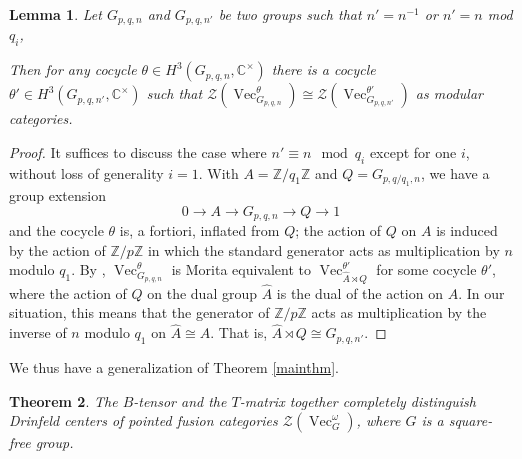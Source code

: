 \documentclass[11pt]{book}
\newtheorem{theorem}{Theorem}[section]
\newtheorem{Lem}[theorem]{Lemma}
\theoremstyle{Rem}
\theoremstyle{definition}
\numberwithin{equation}{section}
\newcommand\inv{^{-1}}
\newcommand\Vect{\operatorname{Vec}}
\newcommand\CC{\mathbb C}
\newcommand\ZZ{\mathbb Z}
\newcommand\CCu{\CC^\times}
\newcommand\CTR{\mathcal Z}
\newcommand\semdir{\rtimes}
\begin{document}
\begin{Lem}
Let $G_{p,q,n}$ and $G_{p,q,n'}$ be two groups such that $n'=n\inv$ or $n'=n$ mod $q_i$,

  Then for any cocycle $\theta\in H^3(G_{p,q,n},\CCu)$ there is a cocycle $\theta'\in H^3(G_{p,q,n'},\CCu)$ such that $\CTR(\Vect_{G_{p,q,n}}^\theta)\cong\CTR(\Vect_{G_{p,q,n'}}^{\theta'})$ as modular categories.
\end{Lem}
\begin{proof}
  It suffices to discuss the case where $n'\equiv n\mod q_i$ except for one $i$, without loss of generality $i=1$. With $A=\ZZ/q_1\ZZ$ and $Q=G_{p,q/q_1,n}$, we have a group extension
  \begin{equation}
    0\rightarrow A\rightarrow G_{p,q,n}\rightarrow Q\rightarrow 1
  \end{equation}
  and the cocycle $\theta$ is, a fortiori, inflated from $Q$; the action of $Q$ on $A$ is induced by the action of $\ZZ/p\ZZ$ in which the standard generator acts as multiplication by $n$ modulo $q_1$. By \cite{MR2333187}, $\Vect_{G_{p,q,n}}^\theta$ is Morita equivalent to $\Vect_{\hat A\semdir Q}^{\theta'}$ for some cocycle $\theta'$, where the action of $Q$ on the dual group $\hat A$ is the dual of the action on $A$. In our situation, this means that the generator of $\ZZ/p\ZZ$ acts as multiplication by the inverse of $n$ modulo $q_1$ on $\hat A\cong A$. That is, $\hat A\semdir Q\cong G_{p,q,n'}$.
\end{proof}
We thus have a generalization of Theorem \ref{mainthm}.
\begin{theorem}
The $B$-tensor and the $T$-matrix together completely distinguish Drinfeld centers of pointed fusion categories $\CTR(\Vect_G^\omega)$, where $G$ is a square-free group. 
\end{theorem}
\end{document}
